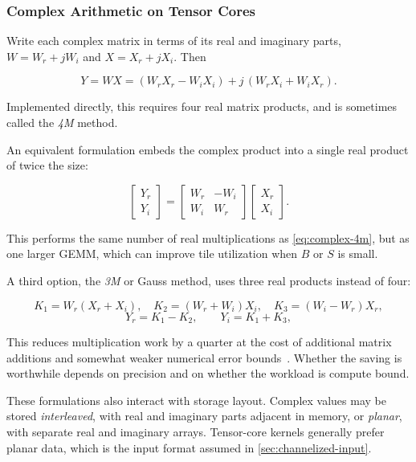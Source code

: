 \subsubsection{Complex Arithmetic on Tensor Cores}
\label{sec:complex-arithmetic-on-tensor-cores}

Write each complex matrix in terms of its real and imaginary parts, $W = W_r + jW_i$ and $X = X_r + jX_i$. Then

\begin{equation}
  Y = WX = (W_r X_r - W_i X_i) + j\,(W_r X_i + W_i X_r).
  \label{eq:complex-4m}
\end{equation}

Implemented directly, this requires four real matrix products, and is sometimes called the \emph{4M} method.

An equivalent formulation embeds the complex product into a single real product of twice the size:

\begin{equation}
  \begin{bmatrix} Y_r \\ Y_i \end{bmatrix}
  =
  \begin{bmatrix} W_r & -W_i \\ W_i & W_r \end{bmatrix}
  \begin{bmatrix} X_r \\ X_i \end{bmatrix}.
  \label{eq:complex-block}
\end{equation}

This performs the same number of real multiplications as \cref{eq:complex-4m}, but as one larger GEMM, which can improve tile utilization when $B$ or $S$ is small.

A third option, the \emph{3M} or Gauss method, uses three real products instead of four:

\[
  K_1 = W_r(X_r + X_i), \quad
  K_2 = (W_r + W_i)X_i, \quad
  K_3 = (W_i - W_r)X_r,
\]
\[
  Y_r = K_1 - K_2, \qquad Y_i = K_1 + K_3,
\]

This reduces multiplication work by a quarter at the cost of additional matrix additions and somewhat weaker numerical error bounds~\cite{higham1992complex}. Whether the saving is worthwhile depends on precision and on whether the workload is compute bound.

These formulations also interact with storage layout. Complex values may be stored \emph{interleaved}, with real and imaginary parts adjacent in memory, or \emph{planar}, with separate real and imaginary arrays. Tensor-core kernels generally prefer planar data, which is the input format assumed in \cref{sec:channelized-input}.

